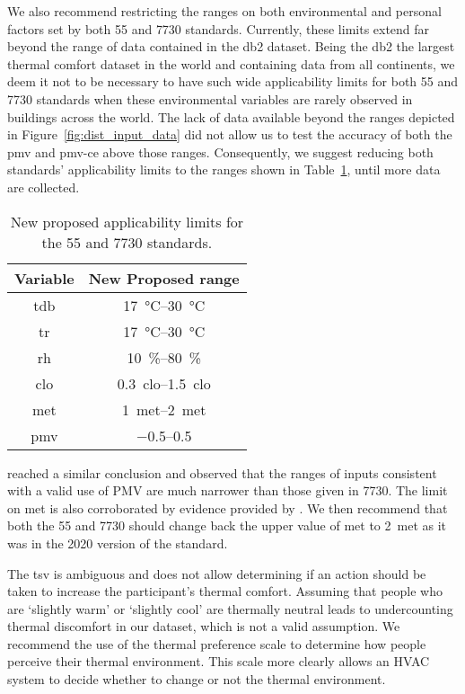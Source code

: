 We also recommend restricting the ranges on both environmental and personal factors set by both \gls{55} and \gls{7730} standards.
Currently, these limits extend far beyond the range of data contained in the \ac{db2} dataset.
Being the \ac{db2} the largest thermal comfort dataset in the world and containing data from all continents, we deem it not to be necessary to have such wide applicability limits for both \gls{55} and \gls{7730} standards when these environmental variables are rarely observed in buildings across the world.
The lack of data available beyond the ranges depicted in Figure~\ref{fig:dist_input_data} did not allow us to test the accuracy of both the \ac{pmv} and \ac{pmv-ce} above those ranges.
Consequently, we suggest reducing both standards' applicability limits to the ranges shown in Table~\ref{tab:ranges}, until more data are collected.
\begin{table}[htb!]
    \centering
    \begin{tabular}{cc}
        \toprule
        Variable & New Proposed range \\
        \midrule
        \ac{tdb} & \qtyrange{17}{30}{\celsius} \\
        \ac{tr} & \qtyrange{17}{30}{\celsius} \\
        \ac{rh} & \qtyrange{10}{80}{\percent} \\
        \ac{clo} & \qtyrange{0.3}{1.5}{clo} \\
        \ac{met} & \qtyrange{1}{2}{met} \\
        \ac{pmv} & \numrange{-.5}{.5} \\
        \bottomrule
    \end{tabular}
    \caption{New proposed applicability limits for the \gls{55} and \gls{7730} standards.}
    \label{tab:ranges}
\end{table}
 reached a similar conclusion and observed that the ranges of inputs consistent with a valid use of PMV are much narrower than those given in \gls{7730}.
The limit on \ac{met} is also corroborated by evidence provided by .
We then recommend that both the \gls{55} and \gls{7730} should change back the upper value of \ac{met} to \qty{2}{met} as it was in the 2020 version of the standard.

The \ac{tsv} is ambiguous and does not allow determining if an action should be taken to increase the participant's thermal comfort.
Assuming that people who are `slightly warm' or `slightly cool' are thermally neutral leads to undercounting thermal discomfort in our dataset, which is not a valid assumption.
We recommend the use of the thermal preference scale to determine how people perceive their thermal environment. 
This scale more clearly allows an HVAC system to decide whether to change or not the thermal environment.

